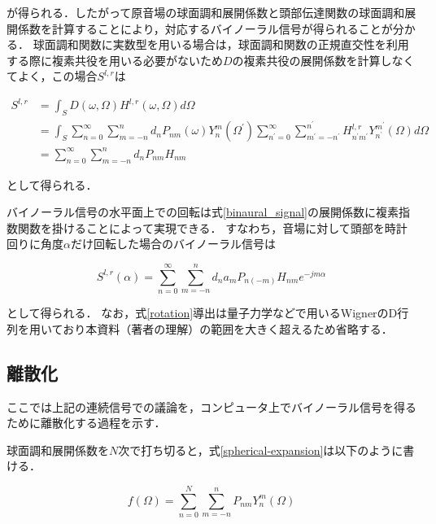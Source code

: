 \documentclass[a4paper]{jsarticle}
\begin{document}
が得られる．したがって原音場の球面調和展開係数と頭部伝達関数の球面調和展開係数を計算することにより，対応するバイノーラル信号が得られることが分かる．
球面調和関数に実数型を用いる場合は，球面調和関数の正規直交性を利用する際に複素共役を用いる必要がないため$D$の複素共役の展開係数を計算しなくてよく，この場合$S^{l, r}$は

\begin{equation}
    \begin{aligned}
        S^{l, r} & =\int_{S} D(\omega, \Omega)H^{l, r}(\omega, \Omega)  d \Omega                                                                                                                                                                                                \\
                 & =\int_{S}\sum_{n=0}^{\infty} \sum_{m=-n}^{n} d_{n} P_{n m}(\omega) Y_{n}^{m}\left(\Omega^{\prime}\right)\sum_{n^{\prime}=0}^{\infty} \sum_{m^{\prime}=-n^{\prime}}^{n^{\prime}} H_{n^{\prime} m^{\prime}}^{l,r} Y_{n^{\prime}}^{m^{\prime}}(\Omega) d \Omega \\
                 & =\sum_{n=0}^{\infty} \sum_{m=-n}^{n} d_{n} P_{n m} H_{n m}
    \end{aligned}
\end{equation}

として得られる．

バイノーラル信号の水平面上での回転は式\ref{binaural_signal}の展開係数に複素指数関数を掛けることによって実現できる．
すなわち，音場に対して頭部を時計回りに角度$\alpha$だけ回転した場合のバイノーラル信号は

\begin{equation}
    \label{rotation}
    S^{l, r}(\alpha)=\sum_{n=0}^{\infty} \sum_{m=-n}^{n} d_{n} a_{m} P_{n(-m)} H_{n m} e^{-j m \alpha}
\end{equation}

として得られる．
なお，式\ref{rotation}導出は量子力学などで用いるWignerのD行列を用いており本資料（著者の理解）の範囲を大きく超えるため省略する．

\subsection{離散化}

ここでは上記の連続信号での議論を，コンピュータ上でバイノーラル信号を得るために離散化する過程を示す．

球面調和展開係数を$N$次で打ち切ると，式\ref{spherical-expansion}は以下のように書ける．

$$
    f(\Omega)=\sum_{n=0}^{N} \sum_{m=-n}^{n} P_{n m} Y_{n}^{m}(\Omega)
$$
\end{document}
